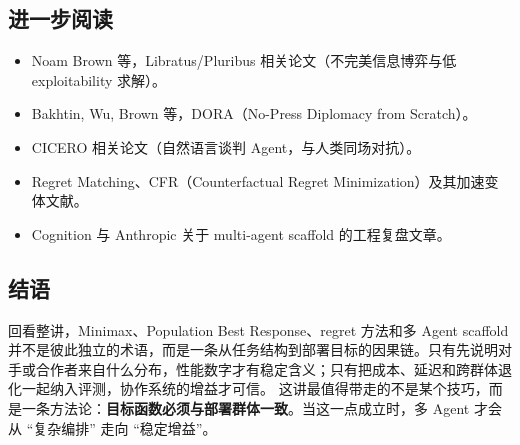 \documentclass[a4paper]{article}
\begin{document}
\subsection{进一步阅读}
\begin{itemize}
    \item Noam Brown 等，Libratus/Pluribus 相关论文（不完美信息博弈与低 exploitability 求解）。
    \item Bakhtin, Wu, Brown 等，DORA（No-Press Diplomacy from Scratch）。
    \item CICERO 相关论文（自然语言谈判 Agent，与人类同场对抗）。
    \item Regret Matching、CFR（Counterfactual Regret Minimization）及其加速变体文献。
    \item Cognition 与 Anthropic 关于 multi-agent scaffold 的工程复盘文章。
\end{itemize}

\subsection{结语}
回看整讲，Minimax、Population Best Response、regret 方法和多 Agent scaffold 并不是彼此独立的术语，而是一条从任务结构到部署目标的因果链。只有先说明对手或合作者来自什么分布，性能数字才有稳定含义；只有把成本、延迟和跨群体退化一起纳入评测，协作系统的增益才可信。
这讲最值得带走的不是某个技巧，而是一条方法论：\textbf{目标函数必须与部署群体一致}。当这一点成立时，多 Agent 才会从 ``复杂编排'' 走向 ``稳定增益''。
\end{document}
